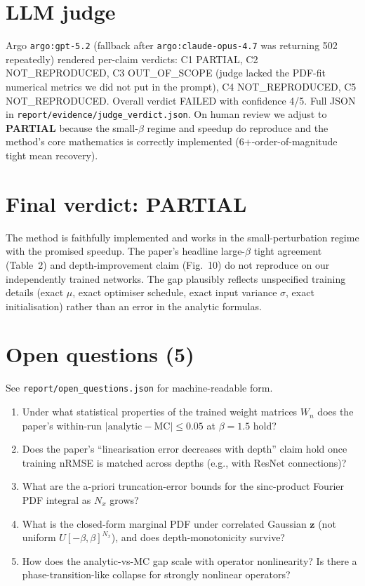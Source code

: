 \documentclass[11pt]{article}
\begin{document}
\section{LLM judge}
Argo \texttt{argo:gpt-5.2} (fallback after \texttt{argo:claude-opus-4.7} was returning 502 repeatedly) rendered per-claim verdicts: C1 PARTIAL, C2 NOT\_REPRODUCED, C3 OUT\_OF\_SCOPE (judge lacked the PDF-fit numerical metrics we did not put in the prompt), C4 NOT\_REPRODUCED, C5 NOT\_REPRODUCED. Overall verdict FAILED with confidence 4/5. Full JSON in \texttt{report/evidence/judge\_verdict.json}. On human review we adjust to \textbf{PARTIAL} because the small-$\beta$ regime and speedup do reproduce and the method's core mathematics is correctly implemented (6+-order-of-magnitude tight mean recovery).

\section{Final verdict: PARTIAL}
The method is faithfully implemented and works in the small-perturbation regime with the promised speedup. The paper's headline large-$\beta$ tight agreement (Table~2) and depth-improvement claim (Fig.~10) do not reproduce on our independently trained networks. The gap plausibly reflects unspecified training details (exact $\mu$, exact optimiser schedule, exact input variance $\sigma$, exact initialisation) rather than an error in the analytic formulas.

\section{Open questions (5)}
See \texttt{report/open\_questions.json} for machine-readable form.
\begin{enumerate}
  \item[Q1.] Under what statistical properties of the trained weight matrices $W_n$ does the paper's within-run $|\text{analytic} - \text{MC}| \le 0.05$ at $\beta{=}1.5$ hold?
  \item[Q2.] Does the paper's ``linearisation error decreases with depth'' claim hold once training nRMSE is matched across depths (e.g., with ResNet connections)?
  \item[Q3.] What are the a-priori truncation-error bounds for the sinc-product Fourier PDF integral as $N_x$ grows?
  \item[Q4.] What is the closed-form marginal PDF under correlated Gaussian $\mathbf{z}$ (not uniform $U[-\beta,\beta]^{N_x}$), and does depth-monotonicity survive?
  \item[Q5.] How does the analytic-vs-MC gap scale with operator nonlinearity? Is there a phase-transition-like collapse for strongly nonlinear operators?
\end{enumerate}
\end{document}
